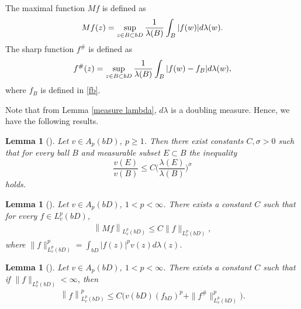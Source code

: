 \documentclass[11pt,a4paper]{amsart}
\numberwithin{equation}{section}
\newtheorem{lemma}[theorem]{Lemma}
\begin{document}
{%


The maximal function $Mf$ is defined as
$$Mf(z)=\sup_{z\in B\subset bD}{1\over\lambda(B)}\int_B |f(w)|d\lambda(w).$$
The sharp function $f^\#$ is defined as
$$f^\#(z)=\sup_{z\in B\subset bD}{1\over\lambda(B)}\int_B |f(w)-f_B|d\lambda(w),$$
where $f_B$ is defined in \eqref{fb}.

{Note that from  Lemma \ref{measure lambda}, $d\lambda$ is a doubling measure. Hence, we have the  following results.}

\begin{lemma}[\cite{Kok}]\label{lv}
Let $v\in A_p(bD)$, $p\geq 1$. Then there exist constants $C, \sigma>0$ such that for every ball $B$ and measurable subset $E\subset B$ the inequality
$$\frac{v(E)}{v(B)}\leq C\Big(\frac{\lambda(E)}{\lambda(B)} \Big)^\sigma$$
holds.
\end{lemma}




\begin{lemma}[\cite{MS}]\label{maximal}
Let $v\in A_p(bD)$, $1< p<\infty$. There exists a constant $C$ such that for every $f\in L_v^p(bD)$,
\begin{align*}
\left\|Mf\right\|_{L_v^p(bD)}\leq C\|f\|_{L_v^p(bD)},
\end{align*}
where $\|f\|_{L_v^p(bD)}^{p}=\int_{bD} |f(z)|^pv(z)d\lambda(z)$.
\end{lemma}

\begin{lemma}[\cite{PS}]\label{lemma-sharp}
Let $v\in A_p(bD)$, $1< p<\infty$. There exists a constant $C$ such that if $\|f\|_{L_v^p(bD)}<\infty$, then
\begin{align*}
\left\|f\right\|_{L_v^p(bD)}^{p}\leq C\Big(v(bD)(f_{bD})^p+\|f^\#\|_{L_v^p(bD)}^{p}\Big).
\end{align*}
\end{lemma}



}
\end{document}
